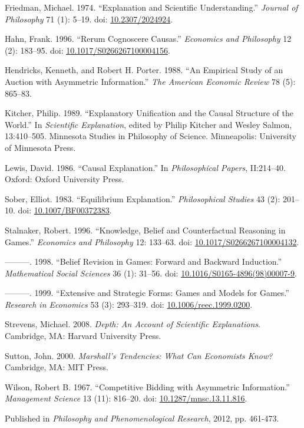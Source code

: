 \documentclass[
  10pt,
  letterpaper,
  DIV=11,
  numbers=noendperiod,
  twoside]{scrartcl}
\newlength{\cslhangindent}
\newenvironment{CSLReferences}[2] %
 {\begin{list}{}{%
  \setlength{\itemindent}{0pt}
  \setlength{\leftmargin}{0pt}
  \setlength{\parsep}{0pt}
  \ifodd #1
   \setlength{\leftmargin}{\cslhangindent}
   \setlength{\itemindent}{-1\cslhangindent}
  \fi
  \setlength{\itemsep}{#2\baselineskip}}}
 {\end{list}}
\begin{document}
\label{refs}
\begin{CSLReferences}{1}{0}
Friedman, Michael. 1974. {``Explanation and Scientific Understanding.''}
\emph{Journal of Philosophy} 71 (1): 5--19. doi:
\href{https://doi.org/10.2307/2024924}{10.2307/2024924}.

Hahn, Frank. 1996. {``Rerum Cognoscere Causas.''} \emph{Economics and
Philosophy} 12 (2): 183--95. doi:
\href{https://doi.org/10.1017/S0266267100004156}{10.1017/S0266267100004156}.

Hendricks, Kenneth, and Robert H. Porter. 1988. {``An Empirical Study of
an Auction with Asymmetric Information.''} \emph{The American Economic
Review} 78 (5): 865--83.

Kitcher, Philip. 1989. {``Explanatory Unification and the Causal
Structure of the World.''} In \emph{Scientific Explanation}, edited by
Philip Kitcher and Wesley Salmon, 13:410--505. Minnesota Studies in
Philosophy of Science. Minneapolis: University of Minnesota Press.

Lewis, David. 1986. {``Causal Explanation.''} In \emph{Philosophical
Papers}, II:214--40. Oxford: Oxford University Press.

Sober, Elliot. 1983. {``Equilibrium Explanation.''} \emph{Philosophical
Studies} 43 (2): 201--10. doi:
\href{https://doi.org/10.1007/BF00372383}{10.1007/BF00372383}.

Stalnaker, Robert. 1996. {``Knowledge, Belief and Counterfactual
Reasoning in Games.''} \emph{Economics and Philosophy} 12: 133--63. doi:
\href{https://doi.org/10.1017/S0266267100004132}{10.1017/S0266267100004132}.

---------. 1998. {``Belief Revision in Games: Forward and Backward
Induction.''} \emph{Mathematical Social Sciences} 36 (1): 31--56. doi:
\href{https://doi.org/10.1016/S0165-4896(98)00007-9}{10.1016/S0165-4896(98)00007-9}.

---------. 1999. {``Extensive and Strategic Forms: Games and Models for
Games.''} \emph{Research in Economics} 53 (3): 293--319. doi:
\href{https://doi.org/10.1006/reec.1999.0200}{10.1006/reec.1999.0200}.

Strevens, Michael. 2008. \emph{Depth: An Account of Scientific
Explanations}. Cambridge, MA: Harvard University Press.

Sutton, John. 2000. \emph{Marshall's Tendencies: What Can Economists
Know?} Cambridge, MA: {MIT} Press.

Wilson, Robert B. 1967. {``Competitive Bidding with Asymmetric
Information.''} \emph{Management Science} 13 (11): 816--20. doi:
\href{https://doi.org/10.1287/mnsc.13.11.816}{10.1287/mnsc.13.11.816}.

\end{CSLReferences}



\noindent Published in\emph{
Philosophy and Phenomenological Research}, 2012, pp. 461-473.
\end{document}
